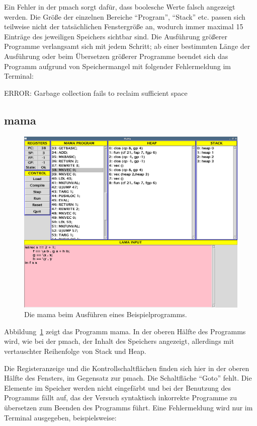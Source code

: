 \documentclass[german, a4paper, parskip, bibliography=totoc]{scrartcl}
\begin{document}
Ein Fehler in der pmach sorgt dafür, dass boolesche Werte falsch angezeigt
werden. Die Größe der einzelnen Bereiche \enquote{Program}, \enquote{Stack}
etc. passen sich teilweise nicht der tatsächlichen Fenstergröße an, wodurch
immer maximal 15 Einträge des jeweiligen Speichers sichtbar sind. Die
Ausführung größerer Programme verlangsamt sich mit jedem Schritt; ab einer
bestimmten Länge der Ausführung oder beim Übersetzen größerer Programme beendet
sich das Programm aufgrund von Speichermangel mit folgender Fehlermeldung im
Terminal:

\begin{addmargin}[2em]{2em}
    \ttfamily ERROR: Garbage collection fails to reclaim sufficient space
\end{addmargin}


\subsection{mama}
\begin{figure}[htb]
    \centering
    \includegraphics[width=\textwidth]{screenshot_old_mama.png}
    \caption{Die mama beim Ausführen eines Beispielprogramms.}
    \label{img_gofer_mama}
\end{figure}

Abbildung~\ref{img_gofer_mama} zeigt das Programm mama. In der oberen Hälfte
des Programms wird, wie bei der pmach, der Inhalt des Speichers angezeigt,
allerdings mit vertauschter Reihenfolge von Stack und Heap.

Die Registeranzeige und die Kontrollschaltflächen finden sich hier in
der oberen Hälfte des Fensters, im Gegensatz zur pmach. Die Schaltfläche
\enquote{Goto} fehlt. Die Elemente im Speicher werden nicht eingefärbt und bei
der Benutzung des Programms fällt auf, das der Versuch syntaktisch inkorrekte
Programme zu übersetzen zum Beenden des Programms führt. Eine Fehlermeldung
wird nur im Terminal ausgegeben, beispielsweise:
\end{document}
